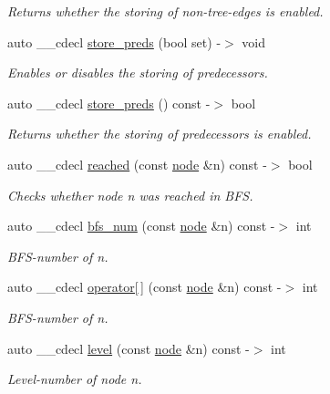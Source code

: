 \begin{DoxyCompactItemize}
\begin{DoxyCompactList}\small\item\em Returns whether the storing of non-\/tree-\/edges is enabled. \end{DoxyCompactList}\item 
auto \+\_\+\+\_\+cdecl \mbox{\hyperlink{classbfs_aa7200a3b11a17b8c87675b1a9bc010aa}{store\+\_\+preds}} (bool set) -\/$>$ void
\begin{DoxyCompactList}\small\item\em Enables or disables the storing of predecessors. \end{DoxyCompactList}\item 
auto \+\_\+\+\_\+cdecl \mbox{\hyperlink{classbfs_add14dde492d4df084198ff2957c9b610}{store\+\_\+preds}} () const -\/$>$ bool
\begin{DoxyCompactList}\small\item\em Returns whether the storing of predecessors is enabled. \end{DoxyCompactList}\item 
auto \+\_\+\+\_\+cdecl \mbox{\hyperlink{classbfs_a589d9acf6d6aeeac5f586a5fdac6528e}{reached}} (const \mbox{\hyperlink{classnode}{node}} \&n) const -\/$>$ bool
\begin{DoxyCompactList}\small\item\em Checks whether node {\itshape n} was reached in B\+FS. \end{DoxyCompactList}\item 
auto \+\_\+\+\_\+cdecl \mbox{\hyperlink{classbfs_aa7e557aefbff0b1308462d9b31ae3de1}{bfs\+\_\+num}} (const \mbox{\hyperlink{classnode}{node}} \&n) const -\/$>$ int
\begin{DoxyCompactList}\small\item\em B\+F\+S-\/number of {\itshape n}. \end{DoxyCompactList}\item 
auto \+\_\+\+\_\+cdecl \mbox{\hyperlink{classbfs_a8cd9e96931e8b8c087f962eb9323dac4}{operator\mbox{[}$\,$\mbox{]}}} (const \mbox{\hyperlink{classnode}{node}} \&n) const -\/$>$ int
\begin{DoxyCompactList}\small\item\em B\+F\+S-\/number of {\itshape n}. \end{DoxyCompactList}\item 
auto \+\_\+\+\_\+cdecl \mbox{\hyperlink{classbfs_a9c2effb945b67f73b3abe33682df139f}{level}} (const \mbox{\hyperlink{classnode}{node}} \&n) const -\/$>$ int
\begin{DoxyCompactList}\small\item\em Level-\/number of node {\itshape n}. \end{DoxyCompactList}\item 

\end{DoxyCompactItemize}
